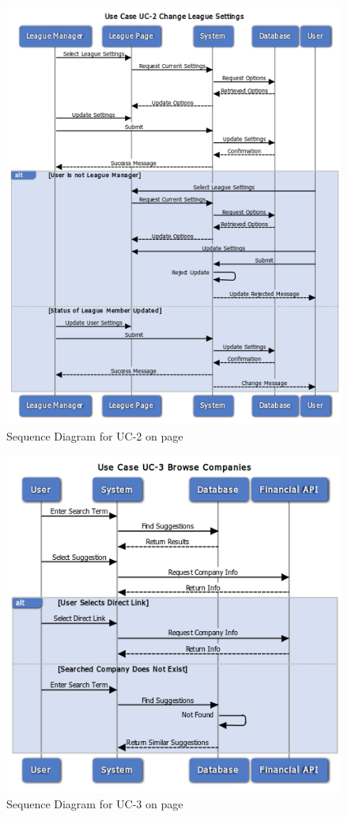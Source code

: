 \begin{figure}
\centering
\includegraphics[width=5.5in]{./Diagrams/SystemSequenceDiagrams/uc2.png}
\caption{Sequence Diagram for UC-2 on page \pageref{UC-2}}
\end{figure}

\begin{figure}
\centering
\includegraphics[width=5.5in]{./Diagrams/SystemSequenceDiagrams/uc3.png}
\caption{Sequence Diagram for UC-3 on page \pageref{UC-3}}
\end{figure}


